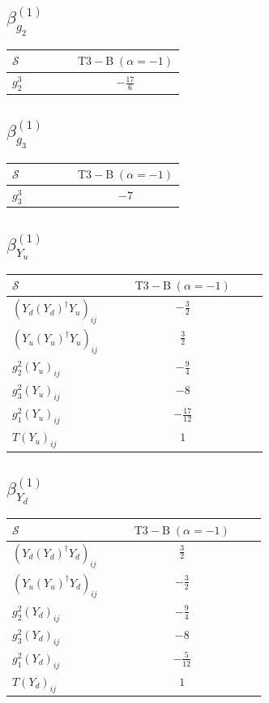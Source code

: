 \documentclass[9pt]{article}
\begin{document}
\subsection*{$ \beta_{g_2}^{(1)} $}
\begin{longtable}{@{}p{0.38\linewidth}c@{}}
\toprule
$\mathcal{S}$ & $ \mathrm{T3-B}\;(\alpha=-1) $ \\
\midrule
$ g_2^3 $ & $ - \frac{17}{6} $ \\
\bottomrule
\end{longtable}
\subsection*{$ \beta_{g_3}^{(1)} $}
\begin{longtable}{@{}p{0.38\linewidth}c@{}}
\toprule
$\mathcal{S}$ & $ \mathrm{T3-B}\;(\alpha=-1) $ \\
\midrule
$ g_3^3 $ & $ -7 $ \\
\bottomrule
\end{longtable}
\subsection*{$ \beta_{Y_u}^{(1)} $}
\begin{longtable}{@{}p{0.38\linewidth}c@{}}
\toprule
$\mathcal{S}$ & $ \mathrm{T3-B}\;(\alpha=-1) $ \\
\midrule
$ (Y_d (Y_d)^{\dagger} Y_u)_{ij} $ & $ - \frac{3}{2} $ \\
$ (Y_u (Y_u)^{\dagger} Y_u)_{ij} $ & $ \frac{3}{2} $ \\
$ g_2^2 (Y_u)_{ij} $ & $ - \frac{9}{4} $ \\
$ g_3^2 (Y_u)_{ij} $ & $ -8 $ \\
$ g_1^2 (Y_u)_{ij} $ & $ - \frac{17}{12} $ \\
$ T (Y_u)_{ij} $ & $ 1 $ \\
\bottomrule
\end{longtable}
\subsection*{$ \beta_{Y_d}^{(1)} $}
\begin{longtable}{@{}p{0.38\linewidth}c@{}}
\toprule
$\mathcal{S}$ & $ \mathrm{T3-B}\;(\alpha=-1) $ \\
\midrule
$ (Y_d (Y_d)^{\dagger} Y_d)_{ij} $ & $ \frac{3}{2} $ \\
$ (Y_u (Y_u)^{\dagger} Y_d)_{ij} $ & $ - \frac{3}{2} $ \\
$ g_2^2 (Y_d)_{ij} $ & $ - \frac{9}{4} $ \\
$ g_3^2 (Y_d)_{ij} $ & $ -8 $ \\
$ g_1^2 (Y_d)_{ij} $ & $ - \frac{5}{12} $ \\
$ T (Y_d)_{ij} $ & $ 1 $ \\
\bottomrule
\end{longtable}
\end{document}
